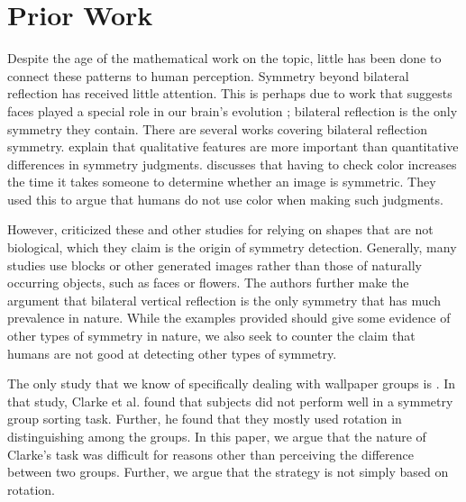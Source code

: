 \section{Prior Work}
Despite the age of the mathematical work on the topic, little has been done to connect these patterns to human perception. Symmetry beyond bilateral reflection has received little attention. This is perhaps due to work that suggests faces played a special role in our brain's evolution \citep{ffa}; bilateral reflection is the only symmetry they contain. There are several works covering bilateral reflection symmetry. \citet{bilateral-qual} explain that qualitative features are more important than quantitative differences in symmetry judgments. \citet{bilateral-color} discusses that having to check color increases the time it takes someone to determine whether an image is symmetric. They used this to argue that humans do not use color when making such judgments. 

However, \citet{bio} criticized these and other studies for relying on shapes that are not biological, which they claim is the origin of symmetry detection. Generally, many studies use blocks or other generated images rather than those of naturally occurring objects, such as faces or flowers. The authors further make the argument that bilateral vertical reflection is the only symmetry that has much prevalence in nature. While the examples provided should give some evidence of other types of symmetry in nature, we also seek to counter the claim that humans are not good at detecting other types of symmetry. 

The only study that we know of specifically dealing with wallpaper groups is \citet{clarke}. In that study, Clarke et al. found that subjects did not perform well in a symmetry group sorting task. Further, he found that they mostly used rotation in distinguishing among the groups. In this paper, we argue that the nature of Clarke's task was difficult for reasons other than perceiving the difference between two groups. Further, we argue that the strategy is not simply based on rotation.
